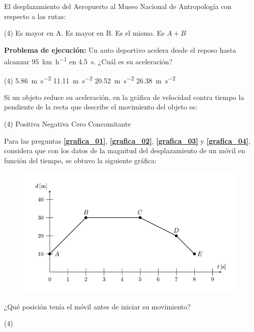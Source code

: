 \documentclass[12pt, letter]{exam}
\begin{document}
\begin{questions}
\begin{figure}[H]
    \end{figure}
    El desplazamiento del Aeropuerto al Museo Nacional de Antropología con respecto a las rutas:
    \begin{tasks}(4)
        \task Es mayor en A.
        \task Es mayor en B.
        \task Es el mismo.
        \task Es $A + B$
    \end{tasks}
    
    \question \textbf{Problema de ejecución:} Un auto deportivo acelera desde el reposo hasta alcanzar \SI{95}{\kilo\meter\per\hour} en \SI{4.5}{\second}. ¿Cuál es su aceleración?
    \begin{tasks}(4)
        \task \SI{5.86}{\meter\per\square\second}
        \task \SI{11.11}{\meter\per\square\second}
        \task \SI{20.52}{\meter\per\square\second}
        \task \SI{26.38}{\meter\per\square\second}
    \end{tasks}
    \question Si un objeto reduce su aceleración, en la gráfica de velocidad contra tiempo la pendiente de la recta que describe el movimiento del objeto es:
    \begin{tasks}(4)
        \task Positiva
        \task Negativa
        \task Cero
        \task Concomitante        
    \end{tasks}
    Para las preguntas \textbf{\ref{grafica_01}}, \textbf{\ref{grafica_02}}, \textbf{\ref{grafica_03}} y \textbf{\ref{grafica_04}}, considera que con los datos de la magnitud del desplazamiento de un móvil en función del tiempo, se obtuvo la siguiente gráfica:
    \begin{figure}[H]
        \centering
        \includegraphics[scale=1.5]{Imagenes/Examen_Grafica_01.png}
    \end{figure}
    \question \label{grafica_01} ¿Qué posición tenía el móvil antes de iniciar su movimiento?
    \begin{tasks}(4)

\end{tasks}
\end{questions}
\end{document}
